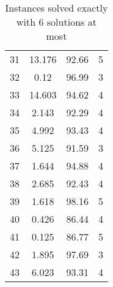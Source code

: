 \begin{table}[!ht]
\begin{tabular}{|c|c|c|c|}
        31 & 13.176 & 92.66 & 5 \\ 
        32 & 0.12 & 96.99 & 3 \\ 
        33 & 14.603 & 94.62 & 4 \\ 
        34 & 2.143 & 92.29 & 4 \\ 
        35 & 4.992 & 93.43 & 4 \\ 
        36 & 5.125 & 91.59 & 3 \\ 
        37 & 1.644 & 94.88 & 4 \\ 
        38 & 2.685 & 92.43 & 4 \\ 
        39 & 1.618 & 98.16 & 5 \\ 
        40 & 0.426 & 86.44 & 4 \\ 
        41 & 0.125 & 86.77 & 5 \\ 
        42 & 1.895 & 97.69 & 3 \\ 
        43 & 6.023 & 93.31 & 4 \\ 
        \hline
    \end{tabular}
    \caption{Instances solved exactly with 6 solutions at most}\label{tab:solveExactly}
\end{table}